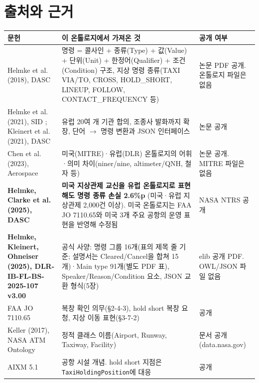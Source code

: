 \documentclass[10pt,a4paper]{article}
\begin{document}
\section{출처와 근거}
\begin{center}\small
\begin{tabularx}{\textwidth}{@{}>{\raggedright\arraybackslash}p{4.3cm}>{\raggedright\arraybackslash}X>{\raggedright\arraybackslash}p{2.6cm}@{}}
\toprule
문헌 & 이 온톨로지에서 가져온 것 & 공개 여부\\\midrule
Helmke et al. (2018), DASC \cite{helmke2018} & 명령 = 콜사인 + 종류(Type) + 값(Value) + 단위(Unit) + 한정어(Qualifier) + 조건(Condition) 구조, 지상 명령 종류(TAXI VIA/TO, CROSS, HOLD\_SHORT, LINEUP, FOLLOW, CONTACT\_FREQUENCY 등) & 논문 PDF 공개. 온톨로지 파일은 없음\\
Helmke et al. (2021), SID \cite{helmke2021sid}; Kleinert et al. (2021), DASC \cite{kleinert2021} & 유럽 20여 개 기관 합의, 조종사 발화까지 확장, 단어 $\to$ 명령 변환과 JSON 인터페이스 & 논문 공개\\
Chen et al. (2023), Aerospace \cite{chen2023} & 미국(MITRE)·유럽(DLR) 온톨로지의 어휘·의미 차이(niner/nine, altimeter/QNH, 철자 등) & 논문 공개. MITRE 파일은 없음\\
\textbf{Helmke, Clarke et al. (2025), DASC} \cite{helmke2025loss} & \textbf{미국 지상관제 교신을 유럽 온톨로지로 표현해도 명령 종류 손실 2.6\%p} (미국·유럽 지상관제 2,000건 이상). 미국 온톨로지는 FAA JO 7110.65와 미국 3개 주요 공항의 운영 표현을 반영해 수정됨 & NASA NTRS 공개\\
\textbf{Helmke, Kleinert, Ohneiser (2025), DLR-IB-FL-BS-2025-107 v3.00} \cite{dlr2025} & 공식 사양: 명령 그룹 16개(표의 제목 줄 기준; 설명서는 Cleared/Cancel을 합쳐 15개)·Main type 91개(별도 PDF 표), Speaker/Reason/Condition 요소, JSON 교환 형식(5장) & elib 공개 PDF. OWL/JSON 파일 없음\\
FAA JO 7110.65 \cite{faa7110} & 복창 확인 의무(§2-4-3), hold short 복창 요청, 지상 이동 표현(§3-7-2) & 공개\\
Keller (2017), NASA ATM Ontology \cite{keller2017} & 정적 클래스 이름(Airport, Runway, Taxiway, Facility) & 문서 공개 (data.nasa.gov)\\
AIXM 5.1 \cite{aixm} & 공항 시설 개념. hold short 지점은 \texttt{TaxiHoldingPosition}에 대응 & 공개\\
\bottomrule
\end{tabularx}
\end{center}
\end{document}
